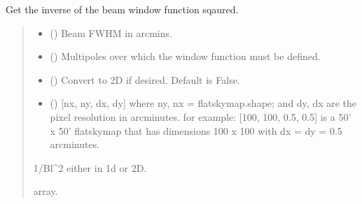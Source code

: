 \documentclass[letterpaper,10pt,english]{sphinxmanual}
\begin{document}
\begin{fulllineitems}
\label{\detokenize{tools:tools.get_blsqinv}}
\pysigstartsignatures
{}
\pysigstopsignatures
\sphinxAtStartPar
Get the inverse of the beam window function sqaured.
\begin{quote}\begin{description}
\begin{itemize}
\item {} 
\sphinxAtStartPar
{} () \textendash{} Beam FWHM in arcmins.

\item {} 
\sphinxAtStartPar
{} () \textendash{} Multipoles over which the window function must be defined.

\item {} 
\sphinxAtStartPar
{} () \textendash{} Convert to 2D if desired.
Default is False.

\item {} 
\sphinxAtStartPar
{} () \textendash{} {[}nx, ny, dx, dy{]} where ny, nx = flatskymap.shape; and dy, dx are the pixel resolution in arcminutes.
for example: {[}100, 100, 0.5, 0.5{]} is a 50’ x 50’ flatskymap that has dimensions 100 x 100 with dx = dy = 0.5 arcminutes.

\end{itemize}

\sphinxAtStartPar
{} \textendash{} 1/Bl\textasciicircum{}2 either in 1d or 2D.

\sphinxAtStartPar
array.

\end{description}\end{quote}

\end{fulllineitems}
\end{document}
